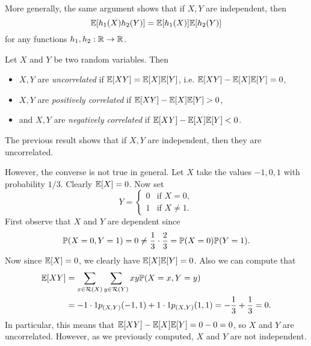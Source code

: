 \begin{remark}
  More generally, the same argument shows
  that if $X, Y$ are independent, then
  \[
    \mathbb{E}[h_1(X)h_2(Y)] = \mathbb{E}[h_1(X)] \mathbb{E}[h_2(Y)]
  \]
  for any functions $h_1, h_2 : \mathbb{R} \to \mathbb{R}$.
\end{remark}

\begin{definition}
  Let $X$ and $Y$ be two random variables. Then
  \begin{itemize}
    \item $X, Y$ are
      \emph{uncorrelated} if $\mathbb{E}[XY] = \mathbb{E}[X] \mathbb{E}[Y]$,
      i.e. $\mathbb{E}[XY] - \mathbb{E}[X] \mathbb{E}[Y] = 0$,
    \item $X, Y$ are
      \emph{positively correlated} if $\mathbb{E}[XY] - \mathbb{E}[X] \mathbb{E}[Y] > 0$,
    \item and $X, Y$ are
      \emph{negatively correlated} if $\mathbb{E}[XY] - \mathbb{E}[X] \mathbb{E}[Y] < 0$.
  \end{itemize}
\end{definition}

\begin{remark}
  The previous result shows that if
  $X, Y$ are independent, then they are
  uncorrelated.
\end{remark}

\begin{example}
  However, the converse is not true in general.
  Let $X$ take the values $-1, 0, 1$ with
  probability $1 / 3$. Clearly $\mathbb{E}[X] = 0$.
  Now set
  \[
    Y = \begin{cases}
      0 & \text{if } X = 0, \\
      1 & \text{if } X \ne 1.
    \end{cases}
  \]
  First observe that $X$ and $Y$ are
  dependent since
  \[
    \mathbb{P}(X = 0, Y = 1) = 0
    \ne \frac{1}{3} \cdot \frac{2}{3} = \mathbb{P}(X = 0) \mathbb{P}(Y = 1).
  \]
  Now since $\mathbb{E}[X] = 0$, we clearly have
  $\mathbb{E}[X] \mathbb{E}[Y] = 0$. Also we can compute that
  \begin{align*}
    \mathbb{E}[XY]
    &= \sum_{x \in \mathcal{R}(X)} \sum_{y \in \mathcal{R}(Y)} xy \mathbb{P}(X = x, Y = y) \\
    &= -1 \cdot 1 p_{(X, Y)}(-1, 1) + 1 \cdot 1 p_{(X, Y)}(1, 1)
    = -\frac{1}{3} + \frac{1}{3} = 0.
  \end{align*}
  In particular, this means
  that $\mathbb{E}[XY] - \mathbb{E}[X] \mathbb{E}[Y] = 0 - 0 = 0$,
  so $X$ and $Y$ are uncorrelated. However,
  as we previously computed, $X$ and $Y$ are
  not independent.
\end{example}

